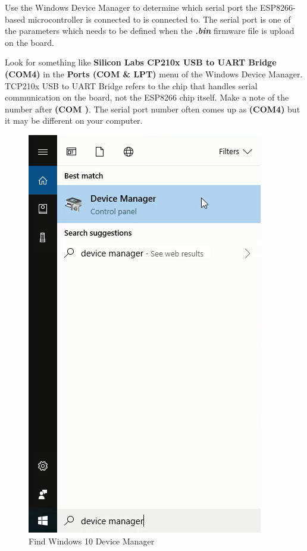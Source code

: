 \documentclass{book}
\makeatletter
\def\maxwidth{\ifdim\Gin@nat@width>\linewidth\linewidth
    \else\Gin@nat@width\fi}
\let\Oldincludegraphics\includegraphics
\renewcommand{\includegraphics}[1]{\Oldincludegraphics[width=.8\maxwidth]{#1}}
\makeatother
\begin{document}
    
        Use the Windows Device Manager to determine which serial port the
ESP8266-based microcontroller is connected to is connected to. The
serial port is one of the parameters which needs to be defined when the
\textbf{\emph{.bin}} firmware file is upload on the board.

Look for something like \textbf{Silicon Labs CP210x USB to UART Bridge
(COM4)} in the \textbf{Ports (COM \& LPT)} menu of the Windows Device
Manager. TCP210x USB to UART Bridge refers to the chip that handles
serial communication on the board, not the ESP8266 chip itself. Make a
note of the number after \textbf{(COM )}. The serial port number often
comes up as \textbf{(COM4)} but it may be different on your computer.

\begin{figure}
\centering
\includegraphics{images/find_device_manager.png}
\caption{Find Windows 10 Device Manager}
\end{figure}
\end{document}
